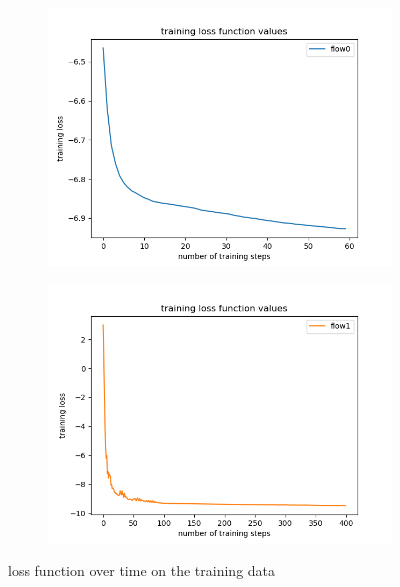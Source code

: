 \documentclass[%
 reprint,
 amsmath,amssymb,
 aps,
]{revtex4-2}
\begin{document}

 \begin{figure}[ht]
	\centering
	\begin{subfigure}[h]{0.4\textwidth}
		\centering
		\includegraphics[width=\textwidth]{figs/training_loss_0_Real_NVP.png}
	\end{subfigure}
	\hfill
	\begin{subfigure}[h]{0.4\textwidth}  
		\centering 
		\includegraphics[width=\textwidth]{figs/training_loss_1_Real_NVP.png}
	\end{subfigure}
	\caption[ loss function over time on the training data]
	{\small loss function over time on the training data} 
	\label{fig:losst}
\end{figure}
\end{document}
